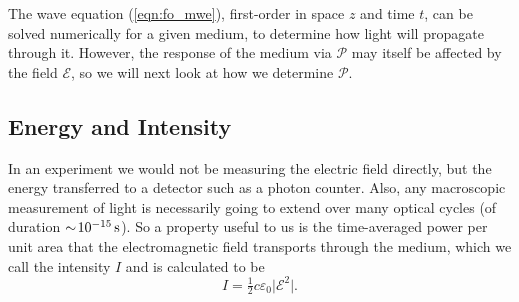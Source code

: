     The wave equation (\ref{eqn:fo_mwe}), first-order in space $z$ and time $t$,
    can be solved numerically for a given medium, to determine how light will
    propagate through it. However, the response of the medium via $\mathcal{P}$
    may itself be affected by the field $\mathcal{E}$, so we will next look at
    how we determine $\mathcal{P}$.

  \subsection{Energy and Intensity}

    In an experiment we would not be measuring the electric field directly, but
    the energy transferred to a detector such as a photon counter. Also, any
    macroscopic measurement of light is necessarily going to extend over many
    optical cycles (of duration $\sim\!\unit[10^{-15}]{s}$). So a property
    useful to us is the time-averaged power per unit area that the
    electromagnetic field transports through the medium, which we call the
    intensity $I$ and is calculated to be\cite{griffiths1999introduction}
    \begin{equation}\label{eqn:intensity}
      I = \tfrac{1}{2}c\varepsilon_0 \lvert \mathcal{E}^2 \rvert.
    \end{equation}
